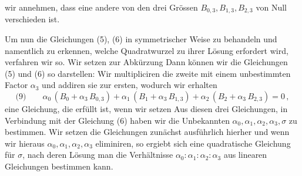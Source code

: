 

wir annehmen, dass eine andere von den drei Grössen $B_{0,3}, B_{1,3}, B_{2,3}$
von Null verschieden ist.

\indent Um nun die Gleichungen (5), (6) in symmetrischer Weise zu
behandeln und namentlich zu erkennen, welche Quadratwurzel
zu ihrer Lösung erfordert wird, verfahren wir so. Wir setzen
zur Abkürzung
Dann können wir die Gleichungen (5) und (6) so darstellen:
Wir multipliciren die zweite mit einem unbestimmten Factor
$\alpha_3$ und addiren sie zur ersten, wodurch wir erhalten
\[
\text{(9)} \qquad \alpha_0\,(B_0 + \alpha_3\,B_{0,3}) + \alpha_1\,(B_1 + \alpha_3\,B_{1,3}) + \alpha_2\,(B_2 + \alpha_3\,B_{2,3}) = 0\,,
\]
eine Gleichung, die erfüllt ist, wenn wir setzen
Aus diesen drei Gleichungen, in Verbindung mit der Gleichung
(6) haben wir die Unbekannten $\alpha_0, \alpha_1, \alpha_2, \alpha_3, \sigma$ zu bestimmen.
Wir setzen die Gleichungen zunächst ausführlich hierher
und wenn wir hieraus $\alpha_0, \alpha_1, \alpha_2, \alpha_3$ eliminiren, so ergiebt sich
eine quadratische Gleichung für $\sigma$, nach deren Lösung man die
Verhältnisse $\alpha_0 : \alpha_1 : \alpha_2 : \alpha_3$ aus linearen Gleichungen bestimmen
kann.

